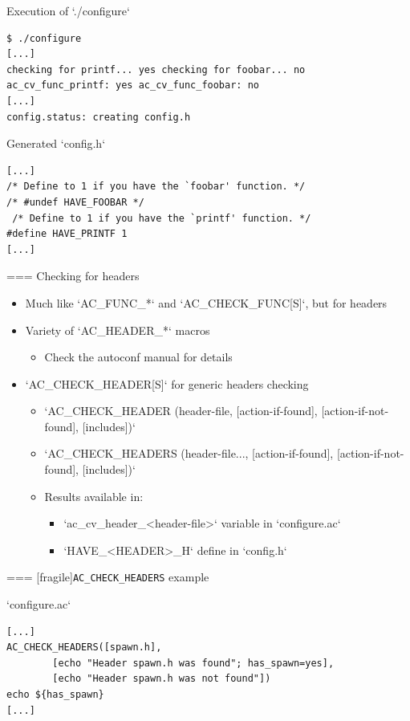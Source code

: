 \begin{block}{Execution of `./configure`}
\begin{verbatim}
$ ./configure
[...]
checking for printf... yes checking for foobar... no ac_cv_func_printf: yes ac_cv_func_foobar: no
[...]
config.status: creating config.h
\end{verbatim}
\end{block}

\begin{block}{Generated `config.h`}
\begin{verbatim}
[...]
/* Define to 1 if you have the `foobar' function. */
/* #undef HAVE_FOOBAR */
 /* Define to 1 if you have the `printf' function. */
#define HAVE_PRINTF 1
[...]
\end{verbatim}
\end{block}



=== {Checking for headers}

  \begin{itemize}
  \item Much like `AC_FUNC_*` and `AC_CHECK_FUNC[S]`, but for headers
  \item Variety of `AC_HEADER_*` macros
    \begin{itemize}
    \item Check the autoconf manual for details
    \end{itemize}
  \item `AC_CHECK_HEADER[S]` for generic headers checking
    \begin{itemize}
    \item `AC_CHECK_HEADER (header-file, [action-if-found], [action-if-not-found], [includes])`
    \item `AC_CHECK_HEADERS (header-file..., [action-if-found], [action-if-not-found], [includes])`
    \item Results available in:
      \begin{itemize}
      \item `ac_cv_header_<header-file>` variable in
        `configure.ac`
      \item `HAVE_<HEADER>_H` define in `config.h`
      \end{itemize}
    \end{itemize}
  \end{itemize}


=== [fragile]{{\tt AC\_CHECK\_HEADERS} example}

\begin{block}{`configure.ac`}
\begin{verbatim}
[...]
AC_CHECK_HEADERS([spawn.h],
        [echo "Header spawn.h was found"; has_spawn=yes],
        [echo "Header spawn.h was not found"])
echo ${has_spawn}
[...]
\end{verbatim}
\end{block}

